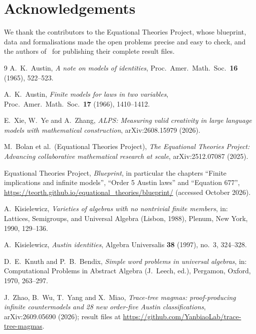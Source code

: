 \section*{Acknowledgements}
We thank the contributors to the Equational Theories Project, whose blueprint,
data and formalisations made the open problems precise and easy to check, and
the authors of~\cite{ZWYM2026} for publishing their complete result files.

\begin{thebibliography}{9}
A.~K.~Austin, \emph{A note on models of identities},
Proc.\ Amer.\ Math.\ Soc.\ \textbf{16} (1965), 522--523.

A.~K.~Austin, \emph{Finite models for laws in two variables},
Proc.\ Amer.\ Math.\ Soc.\ \textbf{17} (1966), 1410--1412.

E.~Xie, W.~Ye and A.~Zhang, \emph{ALPS: Measuring valid creativity in large
language models with mathematical construction}, arXiv:2608.15979 (2026).

M.~Bolan et al.\ (Equational Theories Project),
\emph{The Equational Theories Project: Advancing collaborative mathematical
research at scale}, arXiv:2512.07087 (2025).

Equational Theories Project, \emph{Blueprint}, in particular the chapters
``Finite implications and infinite models'', ``Order 5 Austin laws'' and
``Equation 677'', \url{https://teorth.github.io/equational_theories/blueprint/}
(accessed October 2026).

A.~Kisielewicz, \emph{Varieties of algebras with no nontrivial finite members},
in: Lattices, Semigroups, and Universal Algebra (Lisbon, 1988), Plenum, New
York, 1990, 129--136.

A.~Kisielewicz, \emph{Austin identities}, Algebra Universalis \textbf{38}
(1997), no.~3, 324--328.

D.~E.~Knuth and P.~B.~Bendix, \emph{Simple word problems in universal
algebras}, in: Computational Problems in Abstract Algebra (J.~Leech, ed.),
Pergamon, Oxford, 1970, 263--297.

J.~Zhao, B.~Wu, T.~Yang and X.~Miao, \emph{Trace-tree magmas:
proof-producing infinite countermodels and 28 new order-five Austin
classifications}, arXiv:2609.05690 (2026); result files at
\url{https://github.com/YanbiaoLab/trace-tree-magmas}.
\end{thebibliography}

